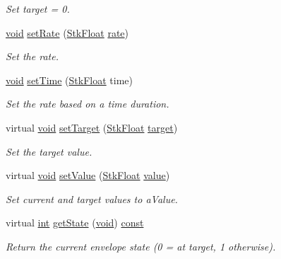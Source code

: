 \begin{DoxyCompactItemize}
\begin{DoxyCompactList}\small\item\em Set target = 0. \end{DoxyCompactList}\item 
\hyperlink{sound_8c_ae35f5844602719cf66324f4de2a658b3}{void} \hyperlink{class_nyq_1_1_envelope_aaf8b21eba099bea1bb06e71a44360b66}{set\+Rate} (\hyperlink{namespace_nyq_a044fa20a706520a617bbbf458a7db7e4}{Stk\+Float} \hyperlink{seqread_8c_ad89d3fac2deab7a9cf6cfc8d15341b85}{rate})
\begin{DoxyCompactList}\small\item\em Set the {\itshape rate}. \end{DoxyCompactList}\item 
\hyperlink{sound_8c_ae35f5844602719cf66324f4de2a658b3}{void} \hyperlink{class_nyq_1_1_envelope_a11a1f717966bed6737d4e24fcf99d486}{set\+Time} (\hyperlink{namespace_nyq_a044fa20a706520a617bbbf458a7db7e4}{Stk\+Float} time)
\begin{DoxyCompactList}\small\item\em Set the {\itshape rate} based on a time duration. \end{DoxyCompactList}\item 
virtual \hyperlink{sound_8c_ae35f5844602719cf66324f4de2a658b3}{void} \hyperlink{class_nyq_1_1_envelope_a88e9382cfea8a61c53375003e7615f64}{set\+Target} (\hyperlink{namespace_nyq_a044fa20a706520a617bbbf458a7db7e4}{Stk\+Float} \hyperlink{lib_2expat_8h_a15a257516a87decb971420e718853137}{target})
\begin{DoxyCompactList}\small\item\em Set the target value. \end{DoxyCompactList}\item 
virtual \hyperlink{sound_8c_ae35f5844602719cf66324f4de2a658b3}{void} \hyperlink{class_nyq_1_1_envelope_aeccbe0f55e46decc568b7aab10008b50}{set\+Value} (\hyperlink{namespace_nyq_a044fa20a706520a617bbbf458a7db7e4}{Stk\+Float} \hyperlink{lib_2expat_8h_a4a30a13b813682e68c5b689b45c65971}{value})
\begin{DoxyCompactList}\small\item\em Set current and target values to {\itshape a\+Value}. \end{DoxyCompactList}\item 
virtual \hyperlink{xmltok_8h_a5a0d4a5641ce434f1d23533f2b2e6653}{int} \hyperlink{class_nyq_1_1_envelope_aa42b95d1485988d1685bd707f964cd13}{get\+State} (\hyperlink{sound_8c_ae35f5844602719cf66324f4de2a658b3}{void}) \hyperlink{getopt1_8c_a2c212835823e3c54a8ab6d95c652660e}{const} 
\begin{DoxyCompactList}\small\item\em Return the current envelope {\itshape state} (0 = at target, 1 otherwise). \end{DoxyCompactList}\end{DoxyCompactItemize}

